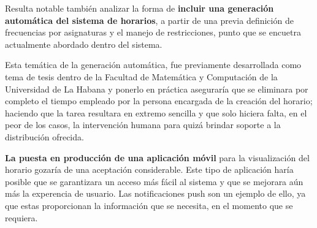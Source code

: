 Resulta notable también analizar la forma de \textbf{incluir una generación automática del sistema de horarios}, a partir de una previa definición de frecuencias por asignaturas y el manejo de restricciones, punto que se encuetra actualmente abordado dentro del sistema.

Esta temática de la generación automática, fue previamente desarrollada como tema de tesis dentro de la Facultad de Matemática y Computación de la Universidad de La Habana y ponerlo en práctica aseguraría que se eliminara por completo el tiempo empleado por la persona encargada de la creación del horario; haciendo que la tarea resultara en extremo sencilla y que solo hiciera falta, en el peor de los casos, la intervención humana para quizá brindar soporte a la distribución ofrecida. 


\textbf{La puesta en producción de una aplicación móvil} para la visualización del horario gozaría de una aceptación considerable. Este tipo de aplicación haría posible que se garantizara un acceso más fácil al sistema  y que se mejorara aún más la experencia de usuario. Las notificaciones push son un ejemplo de ello, ya que estas proporcionan la información que se necesita, en el momento que se requiera. 














